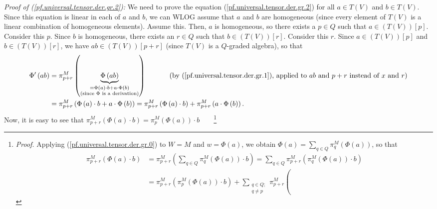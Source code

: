 \documentclass[etingof-lie.tex]{subfiles}
\begin{document}
\begin{verlong}
\textit{Proof of (\ref{pf.universal.tensor.der.gr.2}):} We need to prove the
equation (\ref{pf.universal.tensor.der.gr.2}) for all $a\in T\left(  V\right)
$ and $b\in T\left(  V\right)  $. Since this equation is linear in each of $a$
and $b$, we can WLOG assume that $a$ and $b$ are homogeneous (since every
element of $T\left(  V\right)  $ is a linear combination of homogeneous
elements). Assume this. Then, $a$ is homogeneous, so there exists a $p\in Q$
such that $a\in\left(  T\left(  V\right)  \right)  \left[  p\right]  $.
Consider this $p$. Since $b$ is homogeneous, there exists an $r\in Q$ such
that $b\in\left(  T\left(  V\right)  \right)  \left[  r\right]  $. Consider
this $r$. Since $a\in\left(  T\left(  V\right)  \right)  \left[  p\right]  $
and $b\in\left(  T\left(  V\right)  \right)  \left[  r\right]  $, we have
$ab\in\left(  T\left(  V\right)  \right)  \left[  p+r\right]  $ (since
$T\left(  V\right)  $ is a $Q$-graded algebra), so that%
\begin{align*}
\Phi^{\prime}\left(  ab\right)   &  =\pi_{p+r}^{M}\left(  \underbrace{\Phi
\left(  ab\right)  }_{\substack{=\Phi\left(  a\right)  \cdot b+a\cdot
\Phi\left(  b\right)  \\\text{(since }\Phi\text{ is a derivation)}}}\right)
\ \ \ \ \ \ \ \ \ \ \left(  \text{by (\ref{pf.universal.tensor.der.gr.1}),
applied to }ab\text{ and }p+r\text{ instead of }x\text{ and }r\right) \\
&  =\pi_{p+r}^{M}\left(  \Phi\left(  a\right)  \cdot b+a\cdot\Phi\left(
b\right)  \right)  =\pi_{p+r}^{M}\left(  \Phi\left(  a\right)  \cdot b\right)
+\pi_{p+r}^{M}\left(  a\cdot\Phi\left(  b\right)  \right)  .
\end{align*}
Now, it is easy to see that $\pi_{p+r}^{M}\left(  \Phi\left(  a\right)  \cdot
b\right)  =\pi_{p}^{M}\left(  \Phi\left(  a\right)  \right)  \cdot
b$\ \ \ \ \footnote{\textit{Proof.} Applying
(\ref{pf.universal.tensor.der.gr.0}) to $W=M$ and $w=\Phi\left(  a\right)  $,
we obtain $\Phi\left(  a\right)  =\sum\limits_{q\in Q}\pi_{q}^{M}\left(
\Phi\left(  a\right)  \right)  $, so that%
\begin{align*}
\pi_{p+r}^{M}\left(  \Phi\left(  a\right)  \cdot b\right)   &  =\pi_{p+r}%
^{M}\left(  \sum\limits_{q\in Q}\pi_{q}^{M}\left(  \Phi\left(  a\right)
\right)  \cdot b\right)  =\sum\limits_{q\in Q}\pi_{p+r}^{M}\left(  \pi_{q}%
^{M}\left(  \Phi\left(  a\right)  \right)  \cdot b\right) \\
&  =\pi_{p+r}^{M}\left(  \pi_{p}^{M}\left(  \Phi\left(  a\right)  \right)
\cdot b\right)  +\sum\limits_{\substack{q\in Q;\\q\neq p}}\pi_{p+r}^{M}\left(

\end{align*}}
\end{verlong}
\end{document}
